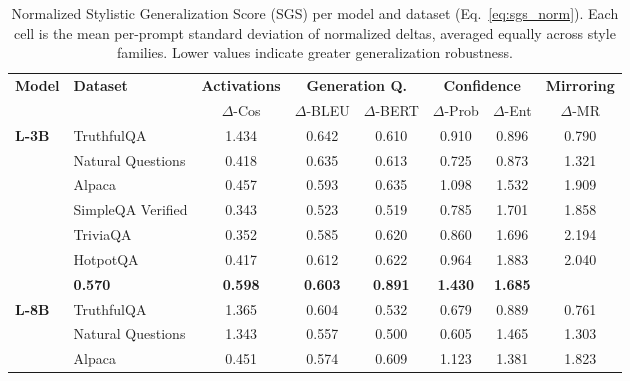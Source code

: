 \begin{table}[ht]
    \centering
    \tiny
    \caption{Normalized Stylistic Generalization Score (SGS) per model and dataset (Eq.~\ref{eq:sgs_norm}). Each cell is the mean per-prompt standard deviation of normalized deltas, averaged equally across style families. Lower values indicate greater generalization robustness.}
    \label{tab:sgs_results}
    \setlength{\tabcolsep}{3pt}
    \renewcommand{\arraystretch}{1.1}
    \begin{tabular}{ll cccccc}
        \toprule
        \textbf{Model} & \textbf{Dataset} & \textbf{Activations} & \multicolumn{2}{c}{\textbf{Generation Q.}} & \multicolumn{2}{c}{\textbf{Confidence}} & \textbf{Mirroring} \\
        \cmidrule(lr){3-3} \cmidrule(lr){4-5} \cmidrule(lr){6-7} \cmidrule(lr){8-8}
        & & $\Delta$-Cos & $\Delta$-BLEU & $\Delta$-BERT & $\Delta$-Prob & $\Delta$-Ent & $\Delta$-MR \\
        \midrule
        \multirow{6}{*}{\textbf{L-3B}}
        & TruthfulQA \cite{lin2022truthfulqa} & 1.434 & 0.642 & 0.610 & 0.910 & 0.896 & 0.790 \\
        & Natural Questions \cite{kwiatkowski2019natural} & 0.418 & 0.635 & 0.613 & 0.725 & 0.873 & 1.321 \\
        & Alpaca \cite{taori2023stanford-alpaca} & 0.457 & 0.593 & 0.635 & 1.098 & 1.532 & 1.909 \\
        & SimpleQA Verified \cite{haas_simpleqa_2026} & 0.343 & 0.523 & 0.519 & 0.785 & 1.701 & 1.858 \\
        & TriviaQA \cite{joshi2017triviaqa} & 0.352 & 0.585 & 0.620 & 0.860 & 1.696 & 2.194 \\
        & HotpotQA \cite{yang2018hotpotqa} & 0.417 & 0.612 & 0.622 & 0.964 & 1.883 & 2.040 \\
        \rowcolor[gray]{.95} \multicolumn{2}{r}{\textbf{Total SGS}} & \textbf{0.570} & \textbf{0.598} & \textbf{0.603} & \textbf{0.891} & \textbf{1.430} & \textbf{1.685} \\
        \midrule
        \multirow{6}{*}{\textbf{L-8B}}
        & TruthfulQA \cite{lin2022truthfulqa} & 1.365 & 0.604 & 0.532 & 0.679 & 0.889 & 0.761 \\
        & Natural Questions \cite{kwiatkowski2019natural} & 1.343 & 0.557 & 0.500 & 0.605 & 1.465 & 1.303 \\
        & Alpaca \cite{taori2023stanford-alpaca} & 0.451 & 0.574 & 0.609 & 1.123 & 1.381 & 1.823 \\

\end{tabular}
\end{table}
